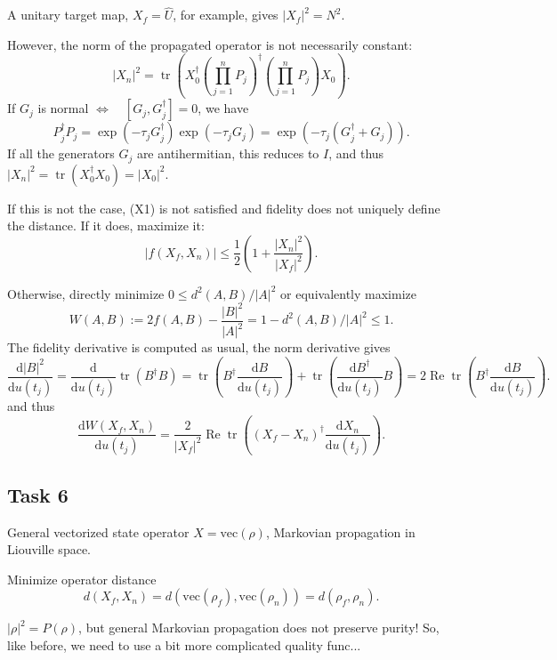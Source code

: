 \documentclass[aps, pra, a4paper]{revtex4}
\newcommand{\I}{I}
\newcommand{\be}{\begin{equation}}
\newcommand{\ee}{\end{equation}}
\newcommand{\eq}{\Leftrightarrow}
\DeclareMathOperator{\tr}{tr}
\DeclareMathOperator{\re}{Re}
\newcommand{\dd}[2]{\frac{\mathrm{d} #1}{\mathrm{d} #2}}
\begin{document}
A unitary target map,
$X_f = \hat{U}$, for example, gives $|X_f|^2 = N^2$.

However, the norm of the propagated operator is not necessarily constant:
\be
|X_n|^2 = \tr\left(X_0^\dagger \left(\prod_{j=1}^{n} P_j\right)^\dagger \left(\prod_{j=1}^{n} P_j\right) X_0\right).
\ee
If $G_j$ is normal $\eq \quad [G_j, G^\dagger_j] = 0$, we have
\be
P_j^\dagger P_j
= \exp(-\tau_j G^\dagger_j) \exp(-\tau_j G_j)
= \exp(-\tau_j (G_j^\dagger + G_j)).
\ee
If all the generators $G_j$ are antihermitian, this reduces to $\I$, and thus
$|X_n|^2 = \tr(X_0^\dagger X_0) = |X_0|^2$.

If this is not the case, (X1) is not satisfied and fidelity does not uniquely define the distance.
If it does,
maximize it:
\be
|f(X_f, X_n)| \le \frac{1}{2} \left(1 +\frac{|X_n|^2}{|X_f|^2} \right).
\ee

Otherwise, directly minimize
$0 \le d^2(A, B)/|A|^2$
or equivalently maximize
\be
W(A,B) := 2 f(A, B) -\frac{|B|^2}{|A|^2} = 1-d^2(A, B)/|A|^2 \le 1.
\ee
The fidelity derivative is computed as usual, the norm derivative gives
\be
\dd{|B|^2}{u(t_j)}
= \dd{}{u(t_j)} \tr(B^\dagger B)
= \tr\left(B^\dagger \dd{B}{u(t_j)}\right)
+\tr\left(\dd{B^\dagger}{u(t_j)} B \right)
= 2 \re \tr\left(B^\dagger \dd{B}{u(t_j)}\right).
\ee
and thus
\be
\dd{W(X_f, X_n)}{u(t_j)}
= \frac{2}{|X_f|^2} \re \tr\left((X_f-X_n)^\dagger \dd{X_n}{u(t_j)}\right).
\ee


\subsection{Task 6}
General vectorized state operator $X = \text{vec}(\rho)$, Markovian propagation
in Liouville space.

Minimize operator distance
\be
d(X_f, X_n) = d(\text{vec}(\rho_f), \text{vec}(\rho_n)) = d(\rho_f, \rho_n).
\ee

$|\rho|^2 = P(\rho)$, but general Markovian propagation does not preserve purity!  
So, like before, we need to use a bit more complicated quality func...
\end{document}
